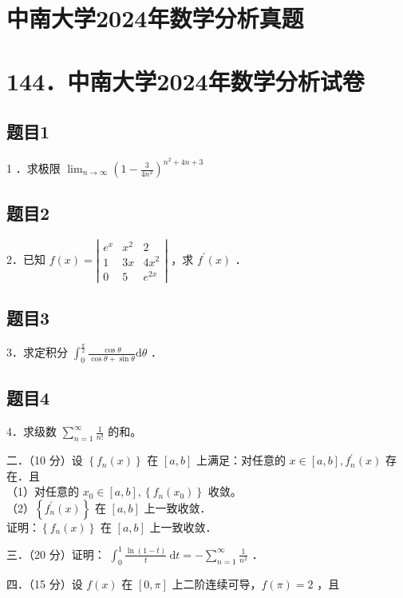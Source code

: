 \documentclass{article}
\begin{document}
\section*{中南大学2024年数学分析真题}
\section*{144．中南大学2024年数学分析试卷}

\subsection{题目1}
1 ．求极限 \(\lim _{n \rightarrow \infty}\left(1-\frac{3}{4 n^{2}}\right)^{n^{2}+4 n+3}\)

\subsection{题目2}
2．已知 \(f(x)=\left|\begin{array}{ccc}e^{x} & x^{2} & 2 \\ 1 & 3 x & 4 x^{2} \\ 0 & 5 & e^{2 x}\end{array}\right|\) ，求 \(f^{\prime}(x)\) ．

\subsection{题目3}
3．求定积分 \(\int_{0}^{\frac{\pi}{2}} \frac{\cos \theta}{\cos \theta+\sin \theta} \mathrm{d} \theta\) ．

\subsection{题目4}
4．求级数 \(\sum_{n=1}^{\infty} \frac{1}{n!}\) 的和。

二．（10 分）设 \(\left\{f_{n}(x)\right\}\) 在 \([a, b]\) 上满足：对任意的 \(x \in[a, b], f_{n}^{\prime}(x)\) 存在．且\\
（1）对任意的 \(x_{0} \in[a, b],\left\{f_{n}\left(x_{0}\right)\right\}\) 收敛。\\
（2）\(\left\{f_{n}^{\prime}(x)\right\}\) 在 \([a, b]\) 上一致收敛．\\
证明：\(\left\{f_{n}(x)\right\}\) 在 \([a, b]\) 上一致收敛．

三．（20 分）证明： \(\int_{0}^{1} \frac{\ln (1-t)}{t} \mathrm{~d} t=-\sum_{n=1}^{\infty} \frac{1}{n^{2}}\) ．

四．（15 分）设 \(f(x)\) 在 \([0, \pi]\) 上二阶连续可导，\(f(\pi)=2\) ，且
\end{document}
